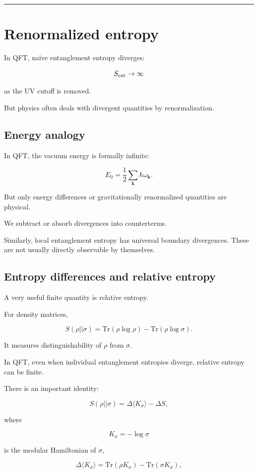 \documentclass[11pt,a4paper]{article}
\begin{document}
\medskip\hrule\medskip

\section{Renormalized entropy}

In QFT, naïve entanglement entropy diverges:

\[
S_{\rm ent}\to\infty
\]

as the UV cutoff is removed.

But physics often deals with divergent quantities by renormalization.

\subsection{Energy analogy}

In QFT, the vacuum energy is formally infinite:

\[
E_0=\frac12\sum_{\mathbf{k}}\hbar\omega_{\mathbf{k}}.
\]

But only energy differences or gravitationally renormalized quantities are physical.

We subtract or absorb divergences into counterterms.

Similarly, local entanglement entropy has universal boundary divergences. These are not usually directly observable by themselves.

\subsection{Entropy differences and relative entropy}

A very useful finite quantity is relative entropy.

For density matrices,

\[
S(\rho||\sigma)
=
\mathrm{Tr}(\rho\log\rho)
-
\mathrm{Tr}(\rho\log\sigma).
\]

It measures distinguishability of $\rho$ from $\sigma$.

In QFT, even when individual entanglement entropies diverge, relative entropy can be finite.

There is an important identity:

\[
S(\rho||\sigma)
=
\Delta\langle K_\sigma\rangle
-
\Delta S,
\]

where

\[
K_\sigma=-\log\sigma
\]

is the modular Hamiltonian of $\sigma$,

\[
\Delta\langle K_\sigma\rangle
=
\mathrm{Tr}(\rho K_\sigma)-\mathrm{Tr}(\sigma K_\sigma),
\]
\end{document}
